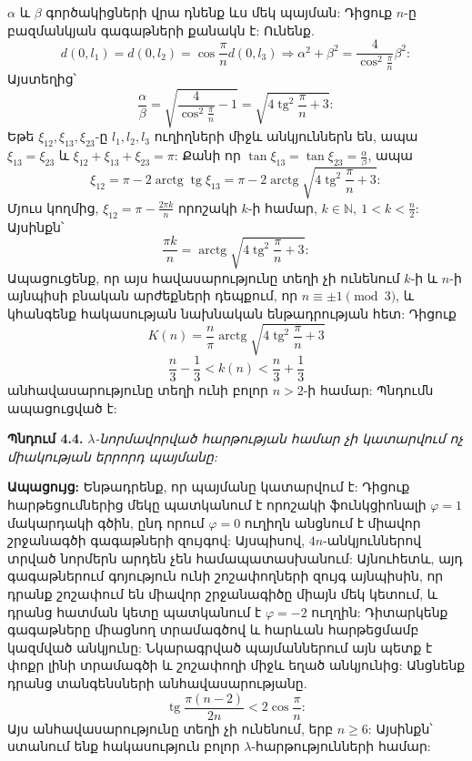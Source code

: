 \documentclass[12pt,a4paper]{article}
\numberwithin{equation}{section}
\numberwithin{figure}{section}
\begin{document}
$\alpha$ և $\beta$ գործակիցների վրա դնենք ևս մեկ պայման: Դիցուք $n$-ը բազմանկյան գագաթների քանակն է: Ունենք.
\begin{equation*}
    d(0, l_1) = d(0, l_2) = \cos\frac{\pi}{n} d(0, l_3) \Rightarrow \alpha^2 + \beta^2 = \frac{4}{\cos^2\frac{\pi}{n}} \beta^2:
\end{equation*}
Այստեղից՝
\begin{equation*}
    \frac{\alpha}{\beta} = \sqrt{\frac{4}{\cos^2\frac{\pi}{n}} - 1} = \sqrt{4\operatorname{tg}^2\frac{\pi}{n} + 3}:
\end{equation*}
Եթե $\xi_{12}, \xi_{13}, \xi_{23}$-ը $l_1, l_2, l_3$ ուղիղների միջև անկյուններն են, ապա $\xi_{13} = \xi_{23}$ և $\xi_{12} + \xi_{13} + \xi_{23} = \pi$: Քանի որ $\tan\xi_{13} = \tan\xi_{23} = \frac{\alpha}{\beta}$, ապա
\begin{equation*}
    \xi_{12} = \pi - 2\operatorname{arctg}\operatorname{tg}\xi_{13} = \pi - 2\operatorname{arctg}\sqrt{4\operatorname{tg}^2\frac{\pi}{n} + 3}:
\end{equation*}
Մյուս կողմից, $\xi_{12} = \pi - \frac{2\pi k}{n}$ որոշակի $k$-ի համար, $k \in \mathbb{N}, \ 1 < k < \frac{n}{2}$: Այսինքն՝
\begin{equation*}
    \frac{\pi k}{n} = \operatorname{arctg}\sqrt{4\operatorname{tg}^2\frac{\pi}{n} + 3}:
\end{equation*}
Ապացուցենք, որ այս հավասարությունը տեղի չի ունենում $k$-ի և $n$-ի այնպիսի բնական արժեքների դեպքում, որ $n \equiv \pm 1 \pmod 3$, և կհանգենք հակասության նախնական ենթադրության հետ: Դիցուք
\begin{equation*}
    K(n) = \frac{n}{\pi} \operatorname{arctg}\sqrt{4\operatorname{tg}^2\frac{\pi}{n} + 3}
\end{equation*}
\begin{equation*}
    \frac{n}{3} - \frac{1}{3} < k(n) < \frac{n}{3} + \frac{1}{3}
\end{equation*}
անհավասարությունը տեղի ունի բոլոր $n > 2$-ի համար: Պնդումն ապացուցված է: 

\textbf{Պնդում 4.4.} \textit{$\lambda$-նորմավորված հարթության համար չի կատարվում ոչ միակության երրորդ պայմանը:}

\textbf{Ապացույց:} Ենթադրենք, որ պայմանը կատարվում է: Դիցուք հարթեցումներից մեկը պատկանում է որոշակի ֆունկցիոնալի $\varphi = 1$ մակարդակի գծին, ընդ որում $\varphi = 0$ ուղիղն անցնում է միավոր շրջանագծի գագաթների զույգով: Այսպիսով, $4n$-անկյուններով տրված նորմերն արդեն չեն համապատասխանում: Այնուհետև, այդ գագաթներում գոյություն ունի շոշափողների զույգ այնպիսին, որ դրանք շոշափում են միավոր շրջանագիծը միայն մեկ կետում, և դրանց հատման կետը պատկանում է $\varphi = -2$ ուղղին: Դիտարկենք գագաթները միացնող տրամագծով և հարևան հարթեցմամբ կազմված անկյունը: Նկարագրված պայմաններում այն պետք է փոքր լինի տրամագծի և շոշափողի միջև եղած անկյունից: Անցնենք դրանց տանգենսների անհավասարությանը.
\begin{equation*}
    \operatorname{tg}\frac{\pi(n-2)}{2n} < 2\cos\frac{\pi}{n}:
\end{equation*}
Այս անհավասարությունը տեղի չի ունենում, երբ $n \ge 6$: Այսինքն՝ ստանում ենք հակասություն բոլոր $\lambda$-հարթությունների համար: 
\end{document}
